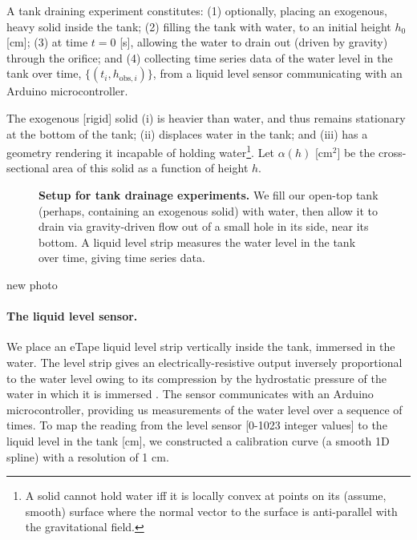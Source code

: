 \documentclass[openacc]{rsproca_new}%
\begin{document}
A tank draining experiment constitutes: 
(1) optionally, placing an exogenous, heavy solid inside the tank; 
(2) filling the tank with water, to an initial height $h_0$ [cm]; 
(3) at time $t=0$ [s], allowing the water to drain out (driven by gravity) through the orifice; and 
(4) collecting time series data of the water level in the tank over time, $\{(t_i, h_{\text{obs}, i}) \}$, from a liquid level sensor communicating with an Arduino microcontroller. 

The exogenous [rigid] solid (i) is heavier than water, and thus remains stationary at the bottom of the tank; (ii) displaces water in the tank; and (iii) has a geometry rendering it incapable of holding water\footnote{A solid cannot hold water iff it is locally convex at points on its (assume, smooth) surface where the normal vector to the surface is anti-parallel with the gravitational field.}. 
Let $\alpha(h)$ [cm$^2$] be the cross-sectional area of this solid as a function of height $h$.

\begin{figure}[h!]
\begin{center}
	\caption{\textbf{Setup for tank drainage experiments.}
	We fill our open-top tank (perhaps, containing an exogenous solid) with water, then allow it to drain via gravity-driven flow out of a small hole in its side, near its bottom. A liquid level strip measures the water level in the tank over time, giving time series data.
	}
	\label{fig:photo_of_tank}
\end{center}
\end{figure}

{\color{red} new photo}

\paragraph{The liquid level sensor.}
We place an eTape\texttrademark\xspace liquid level strip vertically inside the tank, immersed in the water. 
The level strip gives an electrically-resistive output inversely proportional to the water level owing to its compression by the hydrostatic pressure of the water in which it is immersed \cite{eTape}.
The sensor communicates with an Arduino microcontroller, providing us measurements of the water level over a sequence of times. 
To map the reading from the level sensor [0-1023 integer values] to the liquid level in the tank [cm], we constructed a calibration curve (a smooth 1D spline) with a resolution of 1 cm.
\end{document}
